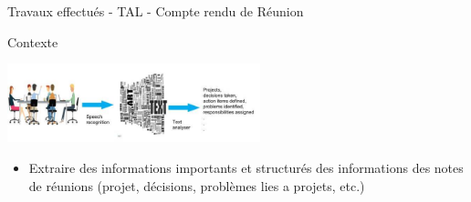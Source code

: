 \documentclass{beamer}
\begin{document}
{{%
%
%   
%


\begin{frame}{Travaux effectués - TAL - Compte rendu de Réunion }
\vspace{-0.3cm}
\begin{block}{Contexte}
	\begin{center}
     \includegraphics[width=0.55\textwidth]{images/reus-image} \\
	\end{center}
\vspace{-0.5cm}
\begin{itemize}
\item Extraire des informations importants et structurés des informations des notes de réunions (projet, décisions, problèmes lies a projets, etc.)
\end{itemize}
\end{block}



\end{frame}}}
\end{document}
